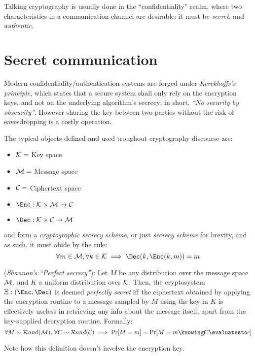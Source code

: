 
Talking cryptography is usually done in the ``confidentiality'' realm, where two characteristics in a communication channel are desirable: it must be \emph{secret}, and \emph{authentic}.

\section{Secret communication}


Modern confidentiality/authentication systems are forged under \emph{Kerckhoffs's principle}, which states that a secure system shall only rely on the encryption keys, and not on the underlying algorithm's secrecy; in short, \emph{``No security by obscurity''}. However sharing the key between two parties without the risk of eavesdropping is a costly operation.

The typical objects defined and used troughout cryptography discourse are:
\begin{itemize}
    \item $\mathcal{K} = $ Key space
    \item $\mathcal{M} = $ Message space
    \item $\mathcal{C} = $ Ciphertext space
    \item $\Enc: \K \times \M \to \C$
    \item $\Dec: \K \times \C \to \M$
\end{itemize}

\Enc{} and \Dec{} form a \emph{cryptographic secrecy scheme}, or just \emph{secrecy scheme} for brevity, and as such, it must abide by the rule:
\[
    \forall m \in \M, \forall k \in \K \implies \Dec(k, \Enc(k, m)) = m
\]

\begin{definition}
    (\textit{Shannon's ``Perfect secrecy''}): Let $M$ be any distribution over the message space $\mathcal{M}$, and $K$ a uniform distribution over $\mathcal{K}$. Then, the cryptosystem $\Xi: (\Enc, \Dec)$ is deemed \emph{perfectly secret} iff the ciphertext obtained by applying the encryption routine to a message sampled by $M$ using tke key in $K$ is effectively useless in retrieving any info about the message itself, apart from the key-supplied decryption routine. Formally:
    \[
        \forall M \sim \mathcal{R}and(\M),\, \forall C \sim \mathcal{R}and(\C) \implies \Pr[M = m] = \Pr[M = m \knowing C \evaluatesto c]
    \]
\end{definition}
Note how this definition doesn't involve the encryption key. %

